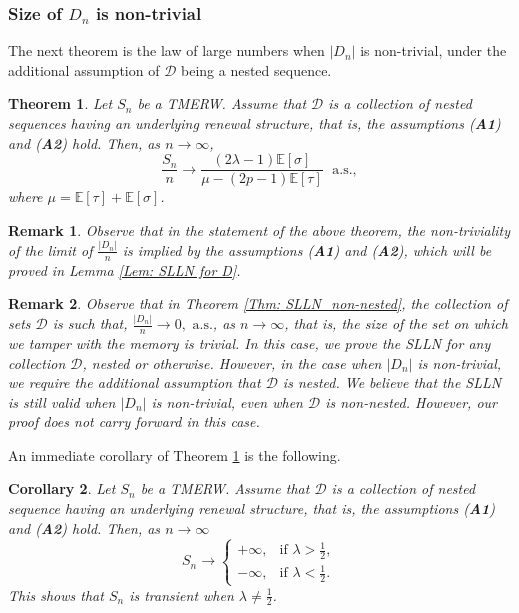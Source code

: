 \documentclass{article}
\numberwithin{equation}{section}
\newtheorem{theorem}{Theorem}[section]
\newtheorem{corollary}[theorem]{Corollary}
\newtheorem{remark}{Remark}
\newcommand{\DD}{\mbox{${\mathcal D}$}}
\newcommand{\1}{\mathbf{1}}
\newcommand{\0}{\mathbf{0}}
\newcommand{\E}{\mbox{${\mathbb E}$}}
\begin{document}
\subsubsection{Size of $D_n$ is non-trivial}
\label{Subsec: Case I}
The next theorem is the law of large numbers when $|D_n|$ is non-trivial, under the additional assumption of $\DD$ being a nested sequence. 
\begin{theorem}
\label{Thm: SLLN_renewal_chain}
Let $S_n$ be a TMERW. Assume that $\DD$ is a collection of nested sequences having an underlying renewal structure, that is,  
the assumptions (\textbf{A1}) and (\textbf{A2}) hold. Then, as $n \to \infty$,
    \begin{equation}
    \label{eq:SLLN}
       \frac{S_n}{n} \longrightarrow \frac{(2\lambda-1)\E[\sigma]}{\mu - (2p-1)\E[\tau]} \; \text{ a.s.},
    \end{equation}
where $\mu = \E[\tau]+ \E[\sigma]$. 
\end{theorem}
\begin{remark}
\label{Re: DD_non_trivial}
Observe that in the statement of the above theorem, the non-triviality of the limit of $\frac{|D_n|}{n}$ is implied by the assumptions (\textbf{A1}) and (\textbf{A2}), which will be proved in Lemma \ref{Lem: SLLN for D}. 
\end{remark}
\begin{remark}
\label{Re: size_D_n_role}
Observe that in Theorem \ref{Thm: SLLN_non-nested}, the collection of sets $\DD$ is such that, $\frac{|D_n|}{n} \longrightarrow 0, \text{ a.s.}$, as $n \to \infty$, that is, the size of the set on which we tamper with the memory is trivial. In this case, we prove the SLLN for any collection $\DD$, nested or otherwise. However, in the case when $|D_n|$ is non-trivial, we require the additional assumption that $\DD$ is nested. We believe that the SLLN is still valid when $|D_n|$ is non-trivial, even when $\DD$ is non-nested. However, our proof does not carry forward in this case.
\end{remark}
An immediate corollary of Theorem \ref{Thm: SLLN_renewal_chain} is the following.
\begin{corollary}
\label{Cor: recurrence_tansience}
Let $S_n$ be a TMERW. Assume that $\DD$ is a collection of nested sequence having an underlying renewal structure, that is,  
the assumptions (\textbf{A1}) and (\textbf{A2}) hold. Then, as $n \to \infty$
\[
S_n \longrightarrow \begin{cases}
+\infty, & \text{if } \lambda >\frac{1}{2}, \\
-\infty, & \text{if } \lambda <\frac{1}{2}.
\end{cases}
\]
This shows that $S_n$ is transient when $\lambda \neq \frac{1}{2}$.
\end{corollary}
\end{document}
